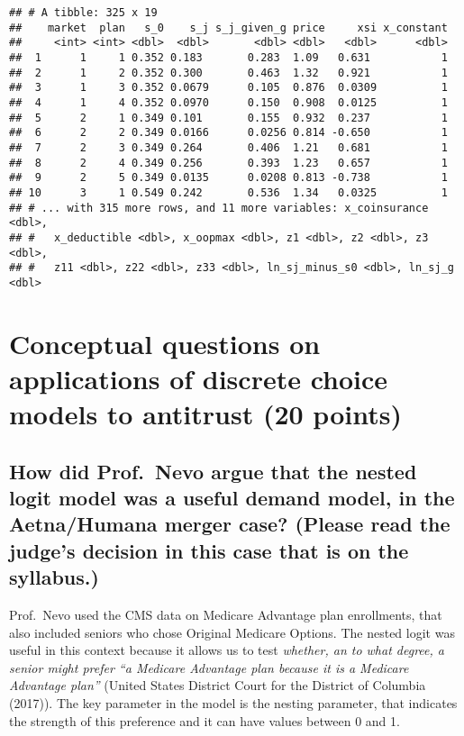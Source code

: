 \documentclass[]{article}
\begin{document}
\begin{verbatim}
## # A tibble: 325 x 19
##    market  plan   s_0    s_j s_j_given_g price     xsi x_constant
##     <int> <int> <dbl>  <dbl>       <dbl> <dbl>   <dbl>      <dbl>
##  1      1     1 0.352 0.183       0.283  1.09   0.631           1
##  2      1     2 0.352 0.300       0.463  1.32   0.921           1
##  3      1     3 0.352 0.0679      0.105  0.876  0.0309          1
##  4      1     4 0.352 0.0970      0.150  0.908  0.0125          1
##  5      2     1 0.349 0.101       0.155  0.932  0.237           1
##  6      2     2 0.349 0.0166      0.0256 0.814 -0.650           1
##  7      2     3 0.349 0.264       0.406  1.21   0.681           1
##  8      2     4 0.349 0.256       0.393  1.23   0.657           1
##  9      2     5 0.349 0.0135      0.0208 0.813 -0.738           1
## 10      3     1 0.549 0.242       0.536  1.34   0.0325          1
## # ... with 315 more rows, and 11 more variables: x_coinsurance <dbl>,
## #   x_deductible <dbl>, x_oopmax <dbl>, z1 <dbl>, z2 <dbl>, z3 <dbl>,
## #   z11 <dbl>, z22 <dbl>, z33 <dbl>, ln_sj_minus_s0 <dbl>, ln_sj_g <dbl>
\end{verbatim}

\hypertarget{conceptual-questions-on-applications-of-discrete-choice-models-to-antitrust-20-points}{%
\section{Conceptual questions on applications of discrete choice models
to antitrust (20
points)}\label{conceptual-questions-on-applications-of-discrete-choice-models-to-antitrust-20-points}}

\hypertarget{how-did-prof.nevo-argue-that-the-nested-logit-model-was-a-useful-demand-model-in-the-aetnahumana-merger-case-please-read-the-judges-decision-in-this-case-that-is-on-the-syllabus.}{%
\subsection{How did Prof.~Nevo argue that the nested logit model was a
useful demand model, in the Aetna/Humana merger case? (Please read the
judge's decision in this case that is on the
syllabus.)}\label{how-did-prof.nevo-argue-that-the-nested-logit-model-was-a-useful-demand-model-in-the-aetnahumana-merger-case-please-read-the-judges-decision-in-this-case-that-is-on-the-syllabus.}}

Prof.~Nevo used the CMS data on Medicare Advantage plan enrollments,
that also included seniors who chose Original Medicare Options. The
nested logit was useful in this context because it allows us to test
\emph{whether, an to what degree, a senior might prefer ``a Medicare
Advantage plan because it is a Medicare Advantage plan''} (United States
District Court for the District of Columbia (2017)). The key parameter
in the model is the nesting parameter, that indicates the strength of
this preference and it can have values between 0 and 1.
\end{document}
